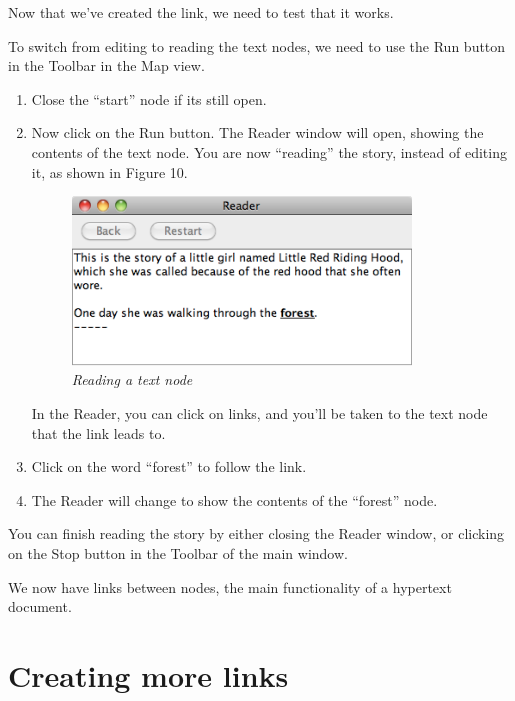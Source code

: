 \documentclass{article}
\begin{document}
Now that we've created the link, we need to test that it works.

To switch from editing to reading the text nodes, we need to use the Run button
in the Toolbar in the Map view.

\begin{enumerate}
  \item Close the ``start'' node if its still open.
  \item Now click on the Run button. The Reader window will open, showing
  the contents of the text node. You are now ``reading'' the story, instead of
  editing it, as shown in Figure 10.

 
\begin{figure}[ht]
  \centering
  \includegraphics[width=9cm]{images/hypedyn-tutorial-1-figure-10}
  \caption{\textit{Reading a text node}}
\end{figure} 

In the Reader, you can click on links, and you'll be taken to the text node
that the link leads to.

\item Click on the word ``forest'' to follow the link.
\item The Reader will change to show the contents of the ``forest'' node.
\end{enumerate}

You can finish reading the story by either closing the Reader window, or
clicking on the Stop button in the Toolbar of the main window.

We now have links between nodes, the main functionality of a hypertext document.


\section{Creating more links}
\end{document}

